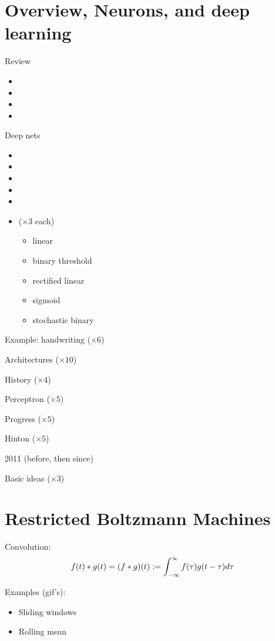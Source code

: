 \section{Overview, Neurons, and deep learning}

Review
\begin{itemize}
\item {}
\item {}
\item {}
\item {}
\end{itemize}

Deep nets
\begin{itemize}
\item {}
\item {}
\item {}
\item {}
\item {}
\item {} ($\times 3$ each)
  \begin{itemize}
  \item linear
  \item binary threshold
  \item rectified linear
  \item sigmoid
  \item stochastic binary
  \end{itemize}
\end{itemize}

Example: handwriting ($\times 6$)

Architectures ($\times 10$)

History ($\times 4$)

Perceptron ($\times 5$)

Progress ($\times 5$)

Hinton ($\times 5$)

2011 (before, then since)

Basic ideas ($\times 3$)

\section{Restricted Boltzmann Machines}

Convolution:
\begin{displaymath}
  f(t)\ast g(t) = (f\ast g)(t) \vcentcolon = \int_{-\infty}^{\infty} f(\tau) g(t-\tau) d\tau
\end{displaymath}

Examples (gif's):
\begin{itemize}
\item Sliding windows
\item Rolling mean
\end{itemize}



